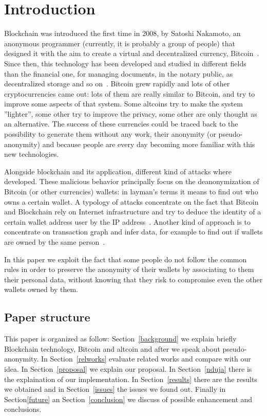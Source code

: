 \section{Introduction}
Blockchain was introduced the first time in 2008, by Satoshi Nakamoto, an
anonymous programmer (currently, it is probably a group of people) that
designed it with the aim to create a virtual and decentralized currency,
Bitcoin~\cite{satoshi}. Since then, this technology has been developed and
studied in different fields than the financial one, for managing documents, in
the notary public, as decentralized storage and so on~\cite{air}. Bitcoin grew
rapidly and lots of other cryptocurrencies came out: lots of them are really
similar to Bitcoin, and try to improve some aspects of that system. Some
altcoins try to make the system ''lighter'', some other try to improve the
privacy, some other are only thought as an alternative. The success of these
currencies could be traced back to the possibility to generate them without any 
work,
their anonymity (or pseudo-anonymity) and because people are every day becoming
more familiar with this new technologies.

Alongside blockchain and its application, different kind of attacks where
developed. These malicious behavior principally focus on the deanonymization of
Bitcoin (or other currencies) wallets: in layman's terms it means to find out
who owns a certain wallet. A typology of attacks concentrate on the fact that
Bitcoin and Blockchain rely on Internet infrastructure and try to deduce the
identity of a certain wallet address user by the IP address~\cite{deanon}.
Another kind of approach is to concentrate on transaction graph and infer data,
for example to find out if wallets are owned by the same person~\cite{fistful}.

In this paper we exploit the fact that some people do not follow the common
rules in order to preserve the anonymity of their wallets by associating to them
their personal data, without knowing that they risk to compromise even the other
wallets owned by them.


\subsection{Paper structure}
This paper is organized as follow: Section~\ref{background} we explain briefly Blockchain
technology, Bitcoin and altcoin and after we speak about pseudo-anonymity. In
Section~\ref{relworks} evaluate related works and compare with our idea. In Section~\ref{proposal} we
explain our proposal. In Section~\ref{nduja} there is the explaination of our
implementation. In Section~\ref{results} there are the results we obtained and in Section~\ref{issues} the issues we found out. Finally in Section\ref{future} an Section~\ref{conclusion} we discuss
of possible enhancement and conclusions.
